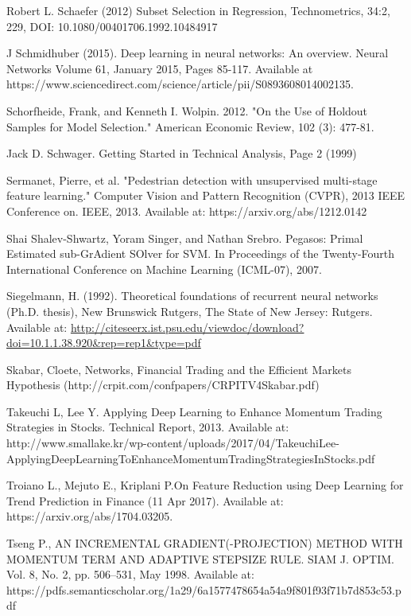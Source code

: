 \documentclass[a4paper,latin]{paper}
\begin{document}
\begin{thebibliography}{bibliography}
Robert L. Schaefer (2012) Subset Selection in Regression, Technometrics, 34:2, 229, DOI: 10.1080/00401706.1992.10484917
  
J Schmidhuber (2015). Deep learning in neural networks: An overview. Neural Networks Volume 61, January 2015, Pages 
85-117. Available at https://www.sciencedirect.com/science/article/pii/S0893608014002135. 
  
Schorfheide, Frank, and Kenneth I. Wolpin. 2012. "On the Use of Holdout Samples for Model Selection." American Economic Review, 102 (3): 477-81.

Jack D. Schwager. Getting Started in Technical Analysis, Page 2 (1999)


Sermanet, Pierre, et al. "Pedestrian detection with unsupervised multi-stage feature learning." Computer Vision and Pattern Recognition (CVPR), 2013 IEEE Conference on. IEEE, 2013.
Available at: https://arxiv.org/abs/1212.0142

Shai Shalev-Shwartz, Yoram Singer, and Nathan Srebro. Pegasos: Primal Estimated sub-GrAdient SOlver for SVM. In Proceedings of the Twenty-Fourth International Conference on Machine Learning (ICML-07), 2007.

Siegelmann, H. (1992). Theoretical foundations of recurrent neural networks (Ph.D. thesis), New Brunswick Rutgers, The State of New Jersey: Rutgers. Available at: \url{http://citeseerx.ist.psu.edu/viewdoc/download?doi=10.1.1.38.920&rep=rep1&type=pdf}

 Skabar, Cloete, Networks, Financial Trading and the Efficient Markets Hypothesis (http://crpit.com/confpapers/CRPITV4Skabar.pdf)

Takeuchi L, Lee Y. Applying Deep Learning to Enhance Momentum Trading Strategies in 
Stocks. Technical Report, 2013. Available at: http://www.smallake.kr/wp-content/uploads/2017/04/TakeuchiLee-ApplyingDeepLearningToEnhanceMomentumTradingStrategiesInStocks.pdf

Troiano L., Mejuto E., Kriplani P.On Feature Reduction using Deep Learning
for Trend Prediction in Finance (11 Apr 2017).  Available at: 
https://arxiv.org/abs/1704.03205.

Tseng P., AN INCREMENTAL GRADIENT(-PROJECTION) METHOD
WITH MOMENTUM TERM AND ADAPTIVE STEPSIZE RULE. SIAM J. OPTIM.  Vol. 8, No. 2, pp. 506–531, May 
1998. Available at: https://pdfs.semanticscholar.org/1a29/6a1577478654a54a9f801f93f71b7d853c53.pdf


\end{thebibliography}
\end{document}
